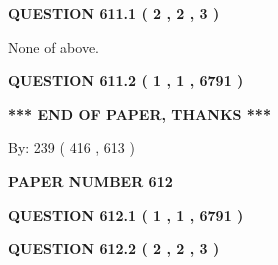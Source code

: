 \documentclass[12pt]{article}
\begin{document}
   
  
\vspace{0.2in}
  
{\textbf{\Large{QUESTION
611.1 
 ( 2 , 2 , 3 )
}}}
  
  
 
 
\noindent{}
 
 
 None of above.
 
 
 
 
  
\vspace{0.2in}
  
{\textbf{\Large{QUESTION
611.2 
 ( 1 , 1 , 6791 )
}}}
  
  
   
   
 \vspace{0.2in}
 
   
   
   
   
\vspace{1.0in} 
{\textbf{\large{ *** END OF PAPER, THANKS *** }}} 
   
   
\hspace{1.0in} By: 
 239 ( 416 ,  613 )
   
   
   
   
\newpage 
\setcounter{page}{ 
   612001 } 
   
   
   
   
 {\textbf{ \Large{ PAPER NUMBER  612  }}}
   
   
\vspace{0.2in}
   
   
   
   
   
   
 \vspace{0.2in}
 
 
 
 
   
   
  
\vspace{0.2in}
  
{\textbf{\Large{QUESTION
612.1 
 ( 1 , 1 , 6791 )
}}}
  
  
  
\vspace{0.2in}
  
{\textbf{\Large{QUESTION
612.2 
 ( 2 , 2 , 3 )
}}}
  
\end{document}
